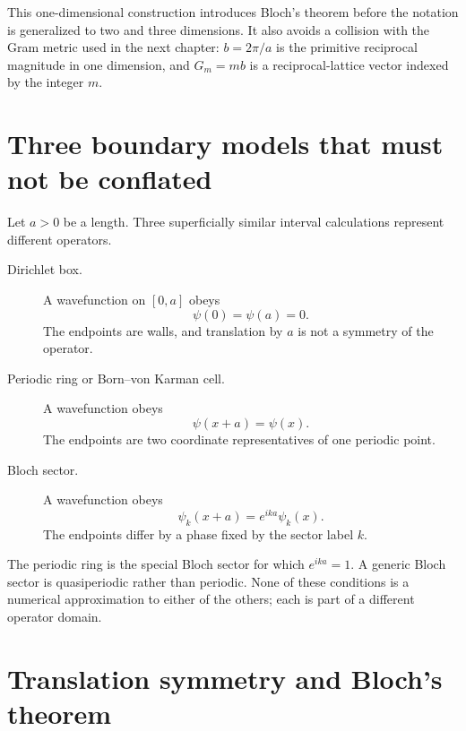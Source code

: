 This one-dimensional construction introduces Bloch's theorem before the
notation is generalized to two and three dimensions. It also avoids a collision
with the Gram metric used in the next chapter: $b=2\pi/a$ is the primitive
reciprocal magnitude in one dimension, and $G_m=mb$ is a reciprocal-lattice
vector indexed by the integer $m$.

\section{Three boundary models that must not be conflated}

Let $a>0$ be a length. Three superficially similar interval calculations
represent different operators.

\begin{description}
  \item[Dirichlet box.] A wavefunction on $[0,a]$ obeys
    \begin{equation}
      \psi(0)=\psi(a)=0.
    \end{equation}
    The endpoints are walls, and translation by $a$ is not a symmetry of the
    operator.
  \item[Periodic ring or Born--von Karman cell.] A wavefunction obeys
    \begin{equation}
      \psi(x+a)=\psi(x).
    \end{equation}
    The endpoints are two coordinate representatives of one periodic point.
  \item[Bloch sector.] A wavefunction obeys
    \begin{equation}
      \psi_k(x+a)=e^{ika}\psi_k(x).
      \label{eq:training-bloch-1d-boundary-condition}
    \end{equation}
    The endpoints differ by a phase fixed by the sector label $k$.
\end{description}

The periodic ring is the special Bloch sector for which $e^{ika}=1$. A generic
Bloch sector is quasiperiodic rather than periodic. None of these conditions is
a numerical approximation to either of the others; each is part of a different
operator domain.

\section{Translation symmetry and Bloch's theorem}

